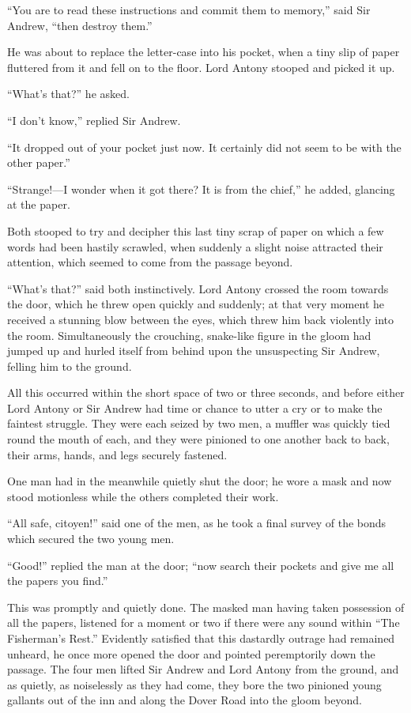 \documentclass[paper=a5,BCOR=7mm,twoside,DIV=calc,12pt,usegeometry,chapterprefix,endperiod,headings=big]{scrbook}
\begin{document}
\enquote{You are to read these instructions and commit them to memory,} said Sir Andrew, \enquote{then destroy them.}

He was about to replace the letter-case into his pocket, when a tiny slip of paper fluttered from it and fell on to the floor. Lord Antony stooped and picked it up.

\enquote{What's that?} he asked.

\enquote{I don't know,} replied Sir Andrew.

\enquote{It dropped out of your pocket just now. It certainly did not seem to be with the other paper.}

\enquote{Strange!---I wonder when it got there? It is from the chief,} he added, glancing at the paper.

Both stooped to try and decipher this last tiny scrap of paper on which a few words had been hastily scrawled, when suddenly a slight noise attracted their attention, which seemed to come from the passage beyond.

\enquote{What's that?} said both instinctively. Lord Antony crossed the room towards the door, which he threw open quickly and suddenly; at that very moment he received a stunning blow between the eyes, which threw him back violently into the room. Simultaneously the crouching, snake-like figure in the gloom had jumped up and hurled itself from behind upon the unsuspecting Sir Andrew, felling him to the ground.

All this occurred within the short space of two or three seconds, and before either Lord Antony or Sir Andrew had time or chance to utter a cry or to make the faintest struggle. They were each seized by two men, a muffler was quickly tied round the mouth of each, and they were pinioned to one another back to back, their arms, hands, and legs securely fastened.

One man had in the meanwhile quietly shut the door; he wore a mask and now stood motionless while the others completed their work.

\enquote{All safe, citoyen!} said one of the men, as he took a final survey of the bonds which secured the two young men.

\enquote{Good!} replied the man at the door; \enquote{now search their pockets and give me all the papers you find.}

This was promptly and quietly done. The masked man having taken possession of all the papers, listened for a moment or two if there were any sound within \enquote{The Fisherman's Rest.} Evidently satisfied that this dastardly outrage had remained unheard, he once more opened the door and pointed peremptorily down the passage. The four men lifted Sir Andrew and Lord Antony from the ground, and as quietly, as noiselessly as they had come, they bore the two pinioned young gallants out of the inn and along the Dover Road into the gloom beyond.
\end{document}
